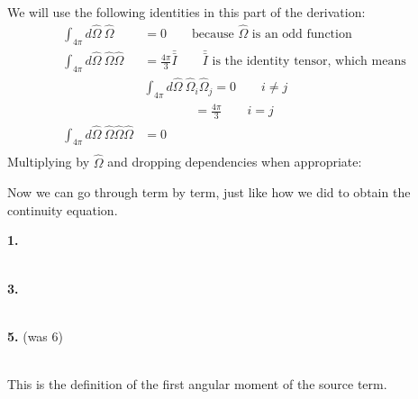 \documentclass[12pt]{article}
\newif\ifeqns
\newcommand{\vOmega}{\ensuremath{\hat{\Omega}}}
\begin{document}
We will use the following identities in this part of the derivation:
\begin{align*} 
\int_{4\pi} d\vOmega \:\vOmega &= 0 \qquad \text{because }\vOmega\text{ is an odd function} \\
%
\int_{4\pi} d\vOmega\: \vOmega \vOmega &= \frac{4\pi}{3}\bar{\bar{I}} \qquad \bar{\bar{I}}\text{ is the identity tensor, which means} \\
%
&\int_{4\pi} d\vOmega\: \vOmega_i \vOmega_j = 0 \qquad i \neq j \nonumber \\
&\qquad \qquad = \frac{4\pi}{3} \qquad i = j \nonumber \\
%
\int_{4\pi} d\vOmega \: \vOmega \vOmega \vOmega &= 0 \qquad \\
\end{align*}
%
Multiplying by $\vOmega$ and dropping dependencies when appropriate:
%
\ifeqns
\begin{align*}
\int_{4\pi} d\vOmega\: \vOmega \frac{1}{v}\frac{\partial \psi}{\partial t} &+ 
\int_{4\pi} d\vOmega\: \vOmega \vOmega \cdot \nabla \psi + 
\int_{4\pi} d\vOmega\: \vOmega \Sigma_t \psi =\nonumber \\
&\int_{4\pi} d\vOmega\: \vOmega \int_{4\pi} d\vOmega'\: \Sigma_s(\vOmega' \cdot \vOmega) \psi(\vec{r}, \vOmega', t) +
\int_{4\pi} d\vOmega\: \vOmega s(\vec{r}, \vOmega, t)\:.
\end{align*}
\else
\vspace*{7em}
\fi

Now we can go through term by term, just like how we did to obtain the continuity equation.

\textbf{1.}
\ifeqns
\begin{equation}
\frac{1}{v}\frac{\partial}{\partial t} \int_{4\pi} d\vOmega\: \vOmega \psi(\vec{r}, \vOmega, t) = \boxed{\frac{1}{v}\frac{\partial \vec{J}}{\partial t}} \nonumber
\end{equation}
\else
\vspace*{3em}\\
\fi
\textbf{3.} 
\ifeqns
\begin{equation}
\Sigma_t \int_{4\pi} d\vOmega\: \vOmega \psi(\vec{r}, \vOmega, t) = \boxed{\Sigma_t  \vec{J}(\vec{r}, t)} \nonumber
\end{equation}
\else
\vspace*{3em}\\
\fi
\textbf{5.} (was 6)
\ifeqns
\begin{equation}
\int_{4\pi} d\vOmega\: \vOmega s(\vec{r}, \vOmega, t) \equiv \boxed{S_{1}(\vec{r}, t)}  \nonumber
\end{equation}
\else
\vspace*{3em}\\
\fi
This is the definition of the first angular moment of the source term. 
\end{document}
